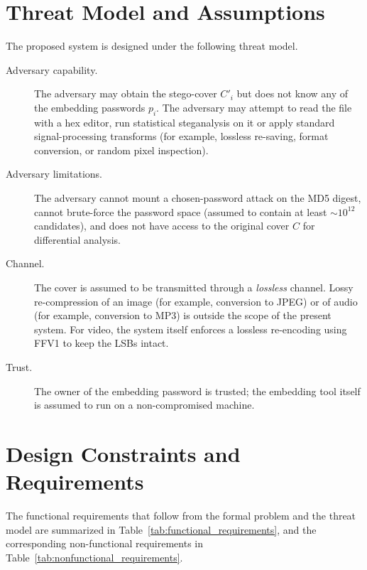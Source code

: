 \section{Threat Model and Assumptions}

The proposed system is designed under the following threat model.

\begin{description}
    \item[Adversary capability.] The adversary may obtain the stego-cover $C'_i$ but does not know any of the embedding passwords $p_i$. The adversary may attempt to read the file with a hex editor, run statistical steganalysis on it or apply standard signal-processing transforms (for example, lossless re-saving, format conversion, or random pixel inspection).
    \item[Adversary limitations.] The adversary cannot mount a chosen-password attack on the MD5 digest, cannot brute-force the password space (assumed to contain at least $\sim 10^{12}$ candidates), and does not have access to the original cover $C$ for differential analysis.
    \item[Channel.] The cover is assumed to be transmitted through a \emph{lossless} channel. Lossy re-compression of an image (for example, conversion to JPEG) or of audio (for example, conversion to MP3) is outside the scope of the present system. For video, the system itself enforces a lossless re-encoding using FFV1 to keep the LSBs intact.
    \item[Trust.] The owner of the embedding password is trusted; the embedding tool itself is assumed to run on a non-compromised machine.
\end{description}

\section{Design Constraints and Requirements}

The functional requirements that follow from the formal problem and the threat model are summarized in Table~\ref{tab:functional_requirements}, and the corresponding non-functional requirements in Table~\ref{tab:nonfunctional_requirements}.

